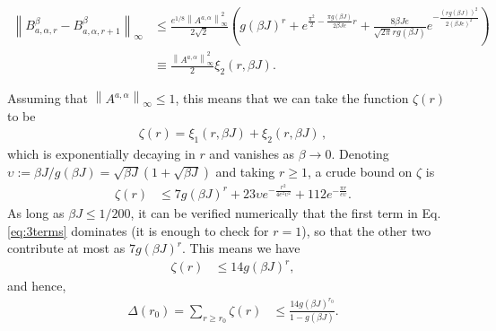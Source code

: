 \documentclass[aps,pra,amsmath,amssymb,twocolumn,10pt]{revtex4-2}
\theoremstyle{definition}
\newcommand{\norm}[1]{\left\|#1\right\|}
\newcommand{\alv}[1]{\textcolor{blue}{[alv] #1}}
\begin{document}
\begin{align}
	\norm{  B^\beta_{a,\alpha,r}- B^\beta_{a,\alpha,r+1} }_\infty & \le \frac{e^{1/8} \norm{A^{a,\alpha}}_\infty^2}{2 \sqrt{2}} \left ( g(\beta J)^r + e^{\frac{\pi^2}{2}- \frac{\pi g(\beta J)}{2 \beta J e } r  }+\frac{8 \beta J e  }{\sqrt{2 \pi} r g(\beta J) } e^{- \frac{(r g(\beta J))^2}{2 ( \beta J  e )^2}}  \right) \\& \equiv \frac{\norm{A^{a,\alpha}}_\infty^2}{2} \xi_2(r,\beta J).
\end{align}

Assuming that $\norm{A^{a,\alpha}}_\infty \le 1$, this means that we can take the function $ \zeta(r)$ to be
\begin{align}
	\zeta(r) = \xi_1(r,\beta J) +\xi_2(r,\beta J)\,,
\end{align}
which is exponentially decaying in $r$ and vanishes as $\beta \rightarrow 0$.
Denoting $\upsilon:=\beta J/g(\beta J)=\sqrt{\beta J}(1+\sqrt{\beta J})$ and taking $r\ge 1$, a crude bound on $\zeta$ is
\begin{align} \label{eq:3terms}
	\zeta(r)&\le 7g(\beta J)^r+23\upsilon e^{-\frac{r^2 }{4 e^2 \upsilon^2}}+112 e^{-\frac{\pi r}{e \upsilon }}.
\end{align}
As long as $\beta J\le 1/200$, it can be verified numerically that the first term in Eq. \eqref{eq:3terms} dominates (it is enough to check for $r=1$), so that the other two contribute at most as $7g(\beta J)^r$. This means we have
\begin{align}
	\zeta(r)&\le 14 g(\beta J)^r,
\end{align}
and hence,
\begin{align}
	\Delta(r_0)=\sum_{r\ge r_0}\zeta(r)&\le \frac{14 g(\beta J)^{r_0}}{1-g(\beta J)}.
\end{align}

\end{document}
